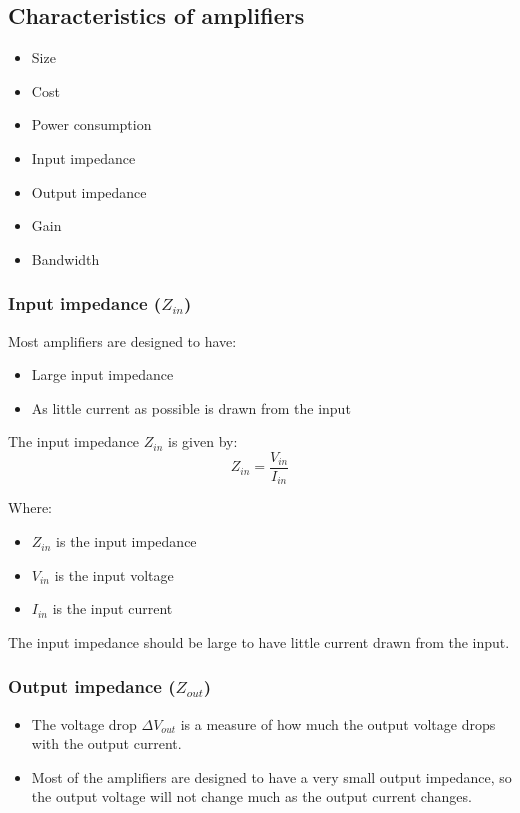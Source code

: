 \documentclass[11pt]{article}
\begin{document}
\subsection{Characteristics of amplifiers}
\label{sec:orgb79eba3}
\begin{itemize}
\item Size
\item Cost
\item Power consumption
\item Input impedance
\item Output impedance
\item Gain
\item Bandwidth
\end{itemize}
\subsubsection{Input impedance (\(Z_{in}\))}
\label{sec:org62f72a4}
Most amplifiers are designed to have:
\begin{itemize}
\item Large input impedance
\item As little current as possible is drawn from the input
\end{itemize}

The input impedance \(Z_{in}\) is given by:
\[Z_{in} = \frac{V_{in}}{I_{in}}\]

Where:
\begin{itemize}
\item \(Z_{in}\) is the input impedance
\item \(V_{in}\) is the input voltage
\item \(I_{in}\) is the input current
\end{itemize}

The input impedance should be large to have little current drawn from the input.

 \newpage
\subsubsection{Output impedance (\(Z_{out}\))}
\label{sec:org0a1b6ef}
\begin{itemize}
\item The voltage drop \(\Delta V_{out}\) is a measure of how much the output voltage drops with the output current.
\item Most of the amplifiers are designed to have a very small output impedance, so the output voltage will not change much as the output current changes.
\end{itemize}
\end{document}
